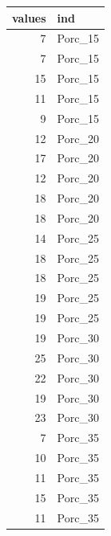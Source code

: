 \documentclass[]{article}
\newenvironment{Shaded}{\begin{snugshade}}{\end{snugshade}}
\newcommand{\KeywordTok}[1]{\textcolor[rgb]{0.13,0.29,0.53}{\textbf{#1}}}
\newcommand{\DataTypeTok}[1]{\textcolor[rgb]{0.13,0.29,0.53}{#1}}
\newcommand{\StringTok}[1]{\textcolor[rgb]{0.31,0.60,0.02}{#1}}
\newcommand{\NormalTok}[1]{#1}
\begin{document}
\begin{tabular}{r|l}
\hline
values & ind\\
\hline
7 & Porc\_15\\
\hline
7 & Porc\_15\\
\hline
15 & Porc\_15\\
\hline
11 & Porc\_15\\
\hline
9 & Porc\_15\\
\hline
12 & Porc\_20\\
\hline
17 & Porc\_20\\
\hline
12 & Porc\_20\\
\hline
18 & Porc\_20\\
\hline
18 & Porc\_20\\
\hline
14 & Porc\_25\\
\hline
18 & Porc\_25\\
\hline
18 & Porc\_25\\
\hline
19 & Porc\_25\\
\hline
19 & Porc\_25\\
\hline
19 & Porc\_30\\
\hline
25 & Porc\_30\\
\hline
22 & Porc\_30\\
\hline
19 & Porc\_30\\
\hline
23 & Porc\_30\\
\hline
7 & Porc\_35\\
\hline
10 & Porc\_35\\
\hline
11 & Porc\_35\\
\hline
15 & Porc\_35\\
\hline
11 & Porc\_35\\
\hline
\end{tabular}

\begin{Shaded}
\end{Shaded}
\end{document}

